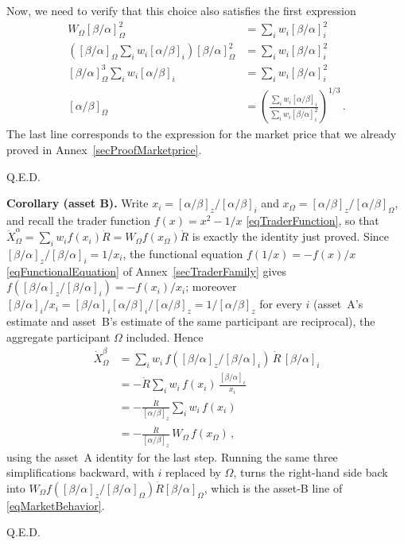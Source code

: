 \documentclass[letterpaper]{article}
\newcommand{\priceAB}{\left[\alpha / \beta\right]}
\newcommand{\priceBA}{\left[\beta / \alpha\right]}
\begin{document}
Now, we need to verify that this choice also satisfies the first expression
\begin{align*}
    W_\Omega \priceBA_\Omega^2 &= \sum_i w_i \priceBA_i^2 \\
    \left(\priceBA_\Omega \sum_i w_i \priceAB_i\right) \priceBA_\Omega^2 &= \sum_i w_i \priceBA_i^2\\
    \priceBA_\Omega^3 \sum_i w_i \priceAB_i &= \sum_i w_i \priceBA_i^2\\
    \priceAB_\Omega &= \left(\frac{\displaystyle \sum_i w_i \priceAB_i}{\displaystyle \sum_i w_i \priceBA_i^2} \right)^{1/3} \,.
\end{align*}
The last line corresponds to the expression for the market price that we already proved in Annex~\ref{secProofMarketprice}.

\begin{flushright}
Q.E.D.
\end{flushright}

\textbf{Corollary (asset B).} Write $x_i = \priceAB_z/\priceAB_i$ and $x_\Omega = \priceAB_z/\priceAB_\Omega$, and recall the trader function $f(x) = x^2 - 1/x$ \eqref{eqTraderFunction}, so that $\dot{X}_\Omega^\alpha = \sum_i w_i f(x_i) \dot{R} = W_\Omega f(x_\Omega) \dot{R}$ is exactly the identity just proved. Since $\priceBA_z/\priceBA_i = 1/x_i$, the functional equation $f(1/x) = -f(x)/x$ \eqref{eqFunctionalEquation} of Annex~\ref{secTraderFamily} gives $f(\priceBA_z/\priceBA_i) = -f(x_i)/x_i$; moreover $\priceBA_i/x_i = \priceBA_i \priceAB_i/\priceAB_z = 1/\priceAB_z$ for every $i$ (asset~A's estimate and asset~B's estimate of the same participant are reciprocal), the aggregate participant $\Omega$ included. Hence
\begin{align*}
    \dot{X}_\Omega^\beta &= \sum_i w_i\, f\!\left(\priceBA_z/\priceBA_i\right)\, \dot{R}\, \priceBA_i\\
    &= -\dot{R} \sum_i w_i\, f(x_i)\, \frac{\priceBA_i}{x_i}\\
    &= -\frac{\dot{R}}{\priceAB_z} \sum_i w_i\, f(x_i)\\
    &= -\frac{\dot{R}}{\priceAB_z}\, W_\Omega\, f(x_\Omega)\,,
\end{align*}
using the asset~A identity for the last step. Running the same three simplifications backward, with $i$ replaced by $\Omega$, turns the right-hand side back into $W_\Omega f(\priceBA_z/\priceBA_\Omega) \dot{R} \priceBA_\Omega$, which is the asset-B line of \eqref{eqMarketBehavior}.
\begin{flushright}
Q.E.D.
\end{flushright}
\end{document}
